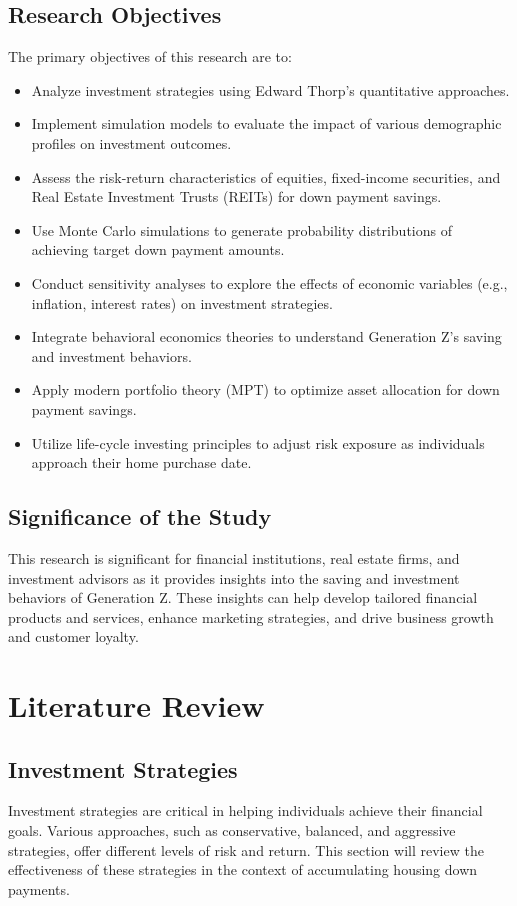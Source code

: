 \documentclass[12pt]{report}
\begin{document}
\section{Research Objectives}
The primary objectives of this research are to:
\begin{itemize}
    \item Analyze investment strategies using Edward Thorp’s quantitative approaches.
    \item Implement simulation models to evaluate the impact of various demographic profiles on investment outcomes.
    \item Assess the risk-return characteristics of equities, fixed-income securities, and Real Estate Investment Trusts (REITs) for down payment savings.
    \item Use Monte Carlo simulations to generate probability distributions of achieving target down payment amounts.
    \item Conduct sensitivity analyses to explore the effects of economic variables (e.g., inflation, interest rates) on investment strategies.
    \item Integrate behavioral economics theories to understand Generation Z’s saving and investment behaviors.
    \item Apply modern portfolio theory (MPT) to optimize asset allocation for down payment savings.
    \item Utilize life-cycle investing principles to adjust risk exposure as individuals approach their home purchase date.
\end{itemize}

\section{Significance of the Study}
This research is significant for financial institutions, real estate firms, and investment advisors as it provides insights into the saving and investment behaviors of Generation Z. These insights can help develop tailored financial products and services, enhance marketing strategies, and drive business growth and customer loyalty.

\chapter{Literature Review}
\section{Investment Strategies}
Investment strategies are critical in helping individuals achieve their financial goals. Various approaches, such as conservative, balanced, and aggressive strategies, offer different levels of risk and return. This section will review the effectiveness of these strategies in the context of accumulating housing down payments.
\end{document}
